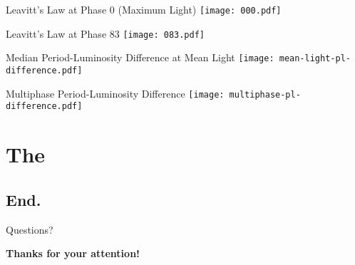 \documentclass[serif,mathserif,professionalfont]{beamer}
\begin{document}
\begin{frame}{Leavitt's Law at Phase 0 (Maximum Light)}
\texttt{[image: 000.pdf]}
\end{frame}

\begin{frame}{Leavitt's Law at Phase 83}
\texttt{[image: 083.pdf]}
\end{frame}

\begin{frame}{Median Period-Luminosity Difference at Mean Light}
\texttt{[image: mean-light-pl-difference.pdf]}
\end{frame}

\begin{frame}{Multiphase Period-Luminosity Difference}
\texttt{[image: multiphase-pl-difference.pdf]}
\end{frame}

\section{The}
\subsection{End.}
\begin{frame}{Questions?}
\begin{center} \textbf{Thanks for your attention!} \end{center}
\end{frame}
\end{document}
